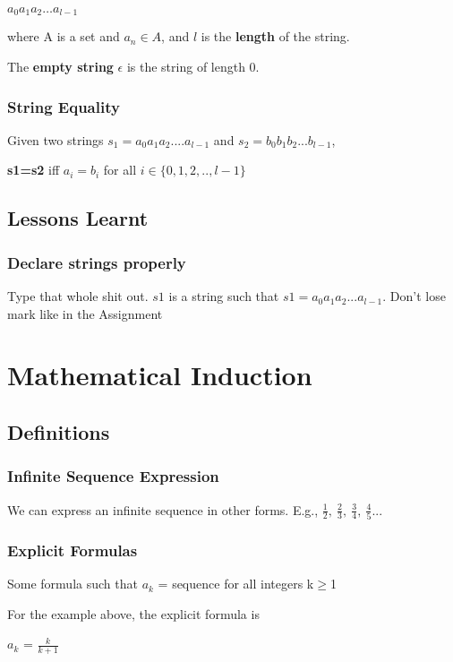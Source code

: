 \documentclass{article}
\newcommand{\sbreak}{\vspace{10pt}}
\begin{document}
\begin{center}
    $a_0a_1a_2\dots a_{l-1}$
\end{center}
where A is a set and $a_n \in A$, and $l$ is the \textbf{length} of the string.

The \textbf{empty string} $\epsilon$ is the string of length 0.

\subsubsection{String Equality}
Given two strings $s_1=a_0a_1a_2....a_{l-1}$ and $s_2=b_0b_1b_2...b_{l-1}$,

\sbreak

\textbf{s1=s2} iff \textbf{$a_i = b_i$} for all $i\in\{0,1,2,..,l-1\}$

\subsection{Lessons Learnt}
\subsubsection{Declare strings properly}
Type that whole shit out. $s1$ is a string such that $s1=a_0a_1a_2...a_{l-1}$. Don't lose mark like in the Assignment

\section{Mathematical Induction}
\subsection{Definitions}
\subsubsection{Infinite Sequence Expression}
We can express an infinite sequence in other forms. E.g., $\frac{1}{2},\ \frac{2}{3},\ \frac{3}{4},\ \frac{4}{5}...$

\subsubsection{Explicit Formulas}

Some formula such that $a_k$ = sequence for all integers k$\geq$1

\sbreak

For the example above, the explicit formula is
\begin{center}
    $a_k$ = $\frac{k}{k+1}$
\end{center}
\end{document}
